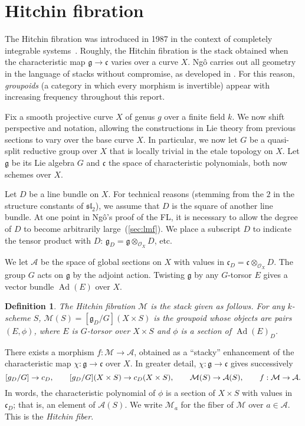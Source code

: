 \documentclass[brochure,english,12pt]{bourbaki}
\theoremstyle{plain}
\newtheorem{definition}[equation]{Definition}
\def\op#1{{\operatorname{#1}}}
\def\sl{\mathfrak{sl}}
\def\g{\mathfrak{g}}
\def\cc{\mathfrak{c}}
\def\A{{\mathcal A}}
\def\M{{\mathcal M}}
\def\O{{\mathcal O}}
\begin{document}
\section{Hitchin fibration}

The Hitchin fibration was introduced in 1987 in the context of
completely integrable systems~\cite{Hitchin:87}.  Roughly, the Hitchin
fibration is the stack obtained when the characteristic map
$\g\to\cc$ varies over a curve $X$.  Ng\^o carries out all geometry
 in the language of stacks without compromise, as developed in
\cite{LMB:2000}.  For this reason, {\it groupoids} (a category in which
every morphism is invertible) appear with increasing frequency throughout this report.

Fix a smooth projective curve $X$ of genus $g$ over a finite field
$k$.  We now shift perspective and notation, allowing the
constructions in Lie theory from previous sections to vary over the
base curve $X$.  In particular, we now let $G$ be a quasi-split
reductive group over $X$ that is locally trivial in the etale topology on
$X$.  Let $\g$ be its Lie algebra $G$ and $\cc$ the space of
characteristic polynomials, both now schemes over $X$.

Let $D$ be a line bundle on $X$. For technical reasons (stemming from
the $2$ in the structure constants of $\sl_2$), we assume that $D$ is
the square of another line bundle.  At one point in Ng\^o's proof of
the FL, it is necessary to allow the degree of $D$ to become
arbitrarily large~(\ref{sec:lmf}).  We place a subscript $D$ to
indicate the tensor product with $D$: $\g_D = \g\otimes_{\O_X}\!\!D$,
etc.

We let $\A$ be the space of global sections on $X$ with values in
$\cc_D=\cc\otimes_{\O_X}\!\!D$.  The group $G$ acts on $\g$ by the
adjoint action.  Twisting $\g$ by any $G$-torsor $E$ gives a
vector bundle $\op{Ad}(E)$ over $X$.

\begin{definition}
  The {\it Hitchin fibration} $\M$ is the stack given as follows.  For any
  $k$-scheme $S$, $\M(S)=[\g_D/G](X\times S)$ is the groupoid whose
  objects are pairs $(E,\phi)$, where $E$ is $G$-torsor over $X\times
  S$ and $\phi$ is a section of $\op{Ad}(E)_D$.
\end{definition}


There exists a morphism $f:\M\to\A$, obtained as a ``stacky''
enhancement of the characteristic map $\chi:\g\to\cc$ over $X$.  In
greater detail, $\chi:\g\to\cc$ gives successively
\[
 \hbox{}[\g_D/G]\to \cc_D,\qquad
 \hbox{}[\g_D/G](X\times S)  \to \cc_D(X\times S), \qquad
 \M(S) \to \A(S), \qquad
f:\M \to \A.
\]
In words, the characteristic polynomial of $\phi$ is a section of
$X\times S$ with values in $\cc_D$; that is, an element of $\A(S)$.
We write $\M_a$ for the fiber of $\M$ over $a\in \A$.  This is the {\it Hitchin fiber}.
\end{document}
